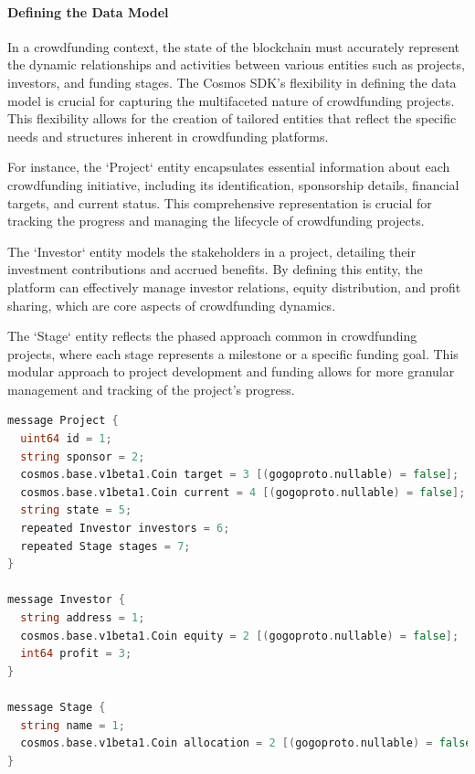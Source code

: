 \paragraph{Defining the Data Model}

In a crowdfunding context, the state of the blockchain must accurately represent the dynamic relationships and activities between various entities such as projects, investors, and funding stages. The Cosmos SDK's flexibility in defining the data model is crucial for capturing the multifaceted nature of crowdfunding projects. This flexibility allows for the creation of tailored entities that reflect the specific needs and structures inherent in crowdfunding platforms.

For instance, the `Project` entity encapsulates essential information about each crowdfunding initiative, including its identification, sponsorship details, financial targets, and current status. This comprehensive representation is crucial for tracking the progress and managing the lifecycle of crowdfunding projects.

The `Investor` entity models the stakeholders in a project, detailing their investment contributions and accrued benefits. By defining this entity, the platform can effectively manage investor relations, equity distribution, and profit sharing, which are core aspects of crowdfunding dynamics.

The `Stage` entity reflects the phased approach common in crowdfunding projects, where each stage represents a milestone or a specific funding goal. This modular approach to project development and funding allows for more granular management and tracking of the project's progress.

\begin{lstlisting}[language=go, caption={Protobuf Definitions for Project, Investor, and Stage}, label=lst:protobuf-definitions]
message Project {
  uint64 id = 1;
  string sponsor = 2;
  cosmos.base.v1beta1.Coin target = 3 [(gogoproto.nullable) = false];
  cosmos.base.v1beta1.Coin current = 4 [(gogoproto.nullable) = false];
  string state = 5;
  repeated Investor investors = 6;
  repeated Stage stages = 7;
}

message Investor {
  string address = 1;
  cosmos.base.v1beta1.Coin equity = 2 [(gogoproto.nullable) = false];
  int64 profit = 3;
}

message Stage {
  string name = 1;
  cosmos.base.v1beta1.Coin allocation = 2 [(gogoproto.nullable) = false];
}
\end{lstlisting}


